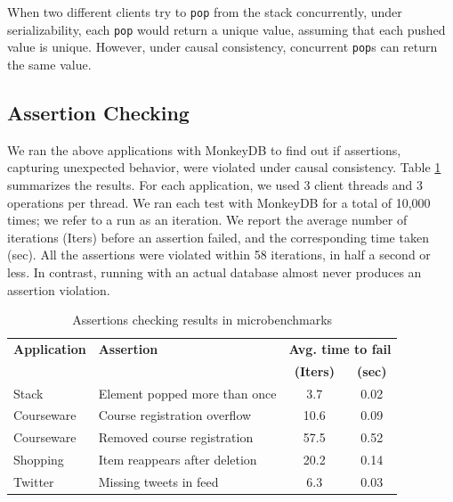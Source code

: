 When two different clients try to \texttt{pop} from the stack concurrently, 
under serializability, each \texttt{pop} would return a unique value, assuming that each pushed value is
unique. However, under causal consistency, concurrent \texttt{pop}s can return the same
value.

	

\subsection{Assertion Checking}
\label{sec:micro-assertion-violations}

We ran the above applications with MonkeyDB to find out if assertions, capturing
unexpected behavior, were violated under causal consistency. Table
\ref{tab:assert} summarizes the results. For each application, 
we used 3 client threads and 3 operations per thread. 
We ran each test with MonkeyDB for a total of 10,000 times; we refer to a run as
an iteration. We  report the average number of iterations (Iters) 
before an assertion failed, and the corresponding time taken 
(sec). All the assertions were violated within 58 iterations, in half a second
or less. In contrast, running with an actual database almost never
produces an assertion violation.

\begin{table}[]
  \centering
	\footnotesize
	\begin{tabular}{|l|l|c|c|}
		
		\hline
		
    \textbf{Application} & \textbf{Assertion}   & \multicolumn{2}{c|}{\textbf{Avg. time to fail}}     \\ 
                         &                      & \textbf{(Iters)} & \textbf{(sec)} \\ \hline
		
    Stack                & Element popped more than once  & 3.7  & 0.02 \\ \hline
		
    Courseware           & Course registration overflow & 10.6 & 0.09  \\ \hline
		
    Courseware           & Removed course registration & 57.5 & 0.52   \\ \hline
		
    Shopping            & Item reappears after deletion & 20.2 & 0.14  \\ \hline
		
    Twitter              & Missing tweets in feed & 6.3 & 0.03 \\ \hline
		
	\end{tabular}
	\caption{\label{tab:assert}Assertions checking results in microbenchmarks}
\end{table}


